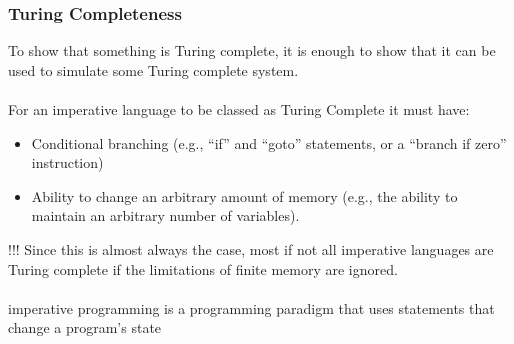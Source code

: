 \begin{frame}
	\frametitle{Turing Completeness}
	
	To show that something is Turing complete, it is enough to show that it can be used to simulate some Turing complete system. 	\\ ~ \\
	For an imperative language to be classed as Turing Complete it must have:

	\begin{itemize}
		\item Conditional branching (e.g., ``if'' and ``goto'' statements, or a ``branch if zero'' instruction)
		\item Ability to change an arbitrary amount of memory (e.g., the ability to maintain an arbitrary number of variables).
	\end{itemize}
\end{frame}

\begin{frame}
	!!! Since this is almost always the case, most if not all imperative languages are Turing complete if the limitations of finite memory are ignored. \\~\\
	\tiny{imperative programming is a programming paradigm that uses statements that change a program's state}
	
\end{frame}

